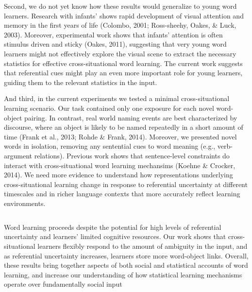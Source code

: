\documentclass[authoryear, review]{elsarticle}
\providecommand{\DIFaddtex}[1]{{\protect\color{blue}\uwave{#1}}} %
\providecommand{\DIFaddbegin}{} %
\providecommand{\DIFaddend}{} %
\providecommand{\DIFadd}[1]{\texorpdfstring{\DIFaddtex{#1}}{#1}} %
\begin{document}
Second, we do not yet know how these results would generalize to young
word learners. Research with infants' shows rapid development of visual
attention and memory in the first years of life (Colombo, 2001;
Ross-sheehy, Oakes, \& Luck, 2003). Moreover, experimental work shows
that infants' attention is often stimulus driven and sticky (Oakes,
2011), suggesting that very young word learners might not effectively
explore the visual scene to extract the necessary statistics for
effective cross-situational word learning. The current work suggests
that referential cues might play an even more important role for young
learners, guiding them to the relevant statistics in the input.

And third, in the current experiments we tested a minimal
cross-situational learning scenario. Our task contained only one
exposure for each novel word-object pairing. In contrast, real world
naming events are best characterized by discourse, where an object is
likely to be named repeatedly in a short amount of time (Frank et al.,
2013; Rohde \& Frank, 2014). Moreover, we presented novel words in
isolation, removing any sentential cues to word meaning (e.g.,
verb-argument relations). Previous work shows that sentence-level
constraints do interact with cross-situational word learning mechansims
(Koehne \& Crocker, 2014). We need more evidence to understand how
representations underlying cross-situational learning change in response
to referential uncertainty at different timescales and in richer
language contexts that more accurately reflect learning environments.

\DIFaddbegin \subsection{\DIFadd{Conclusions}}\label{conclusions}

\DIFaddend Word learning proceeds despite the potential for high levels of
referential uncertainty and learners' limited cognitive resources. Our
work shows that cross-situational learners flexibly respond to the
amount of ambiguity in the input, and as referential uncertainty
increases, learners store more word-object links. Overall, these results
bring together aspects of both social and statistical accounts of word
learning, and increase our understanding of how statistical learning
mechanisms operate over fundamentally social input\DIFaddbegin \DIFadd{.
}

\newpage

\section{\DIFadd{Acknowledgements}}\label{acknowledgements}
\end{document}
